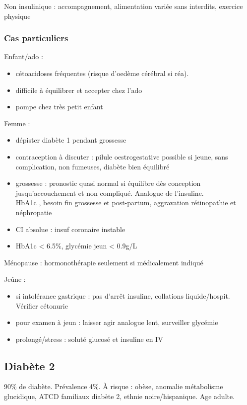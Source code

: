 \documentclass[11pt]{article}
\begin{document}
Non insulinique : accompagnement, alimentation variée sans interdits, exercice physique

\subsubsection{Cas particuliers}
\label{sec:org028826c}
Enfant/ado : 
\begin{itemize}
\item cétoacidoses fréquentes (risque d'oedème cérébral \inc si réa).
\item difficile à équilibrer et accepter chez l'ado
\item pompe chez très petit enfant
\end{itemize}

Femme :
\begin{itemize}
\item dépister diabète 1 pendant grossesse
\item contraception à discuter : pilule oestrogestative possible si \female{} jeune,
sans complication, non fumeuses, diabète bien équilibré
\item grossesse : pronostic quasi normal si équilibre dès conception
jusqu'accouchement et non compliqué. Analogue de l'insuline. \\
\danger{} HbA1c \dec , \inc besoin fin grossesse et \dec post-partum, aggravation rétinopathie
et néphropatie
\item CI absolue : insuf coronaire instable
\item HbA1c < 6.5\%, glycémie jeun < 0.9g/L
\end{itemize}

Ménopause : hormonothérapie seulement si médicalement indiqué

Jeûne : 
\begin{itemize}
\item si intolérance gastrique : pas d'arrêt insuline, collations liquide/hospit. Vérifier cétonurie
\item pour examen à jeun : laisser agir analogue lent, surveiller glycémie
\item prolongé/stress : soluté glucosé et insuline en IV
\end{itemize}

\subsection{Diabète 2}
\label{sec:org70b2aa1}
90\% de diabète. Prévalence 4\%. À risque : obèse, anomalie métabolisme
glucidique, ATCD familiaux diabète 2, ethnie noire/hispanique.
Age adulte.
\end{document}
